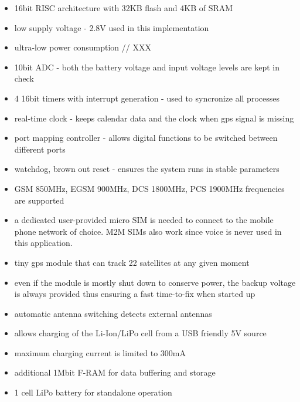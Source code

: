 \documentclass[a4paper,twoside]{refart}
\begin{document}
    \begin{itemize}
        \item 16bit RISC architecture with 32KB flash and 4KB of SRAM
        \item low supply voltage - 2.8V used in this implementation
        \item ultra-low power consumption // XXX
        \item 10bit ADC - both the battery voltage and input voltage levels are kept in check
        \item 4 16bit timers with interrupt generation - used to syncronize all processes
        \item real-time clock - keeps calendar data and the clock when gps signal is missing
        \item port mapping controller - allows digital functions to be switched between different ports
        \item watchdog, brown out reset - ensures the system runs in stable parameters
    \end{itemize}

    \begin{itemize}
        \item GSM 850MHz, EGSM 900MHz, DCS 1800MHz, PCS 1900MHz frequencies are supported
        \item a dedicated user-provided micro SIM is needed to connect to the mobile phone network of choice. M2M SIMs also work since voice is never used in this application.
    \end{itemize}

    \begin{itemize}
        \item tiny gps module that can track 22 satellites at any given moment
        \item even if the module is mostly shut down to conserve power, the backup voltage is always provided thus ensuring a fast time-to-fix when started up
        \item automatic antenna switching detects external antennas
    \end{itemize}
    \begin{itemize}
        \item allows charging of the Li-Ion/LiPo cell from a USB friendly 5V source
        \item maximum charging current is limited to 300mA
    \end{itemize}
    \begin{itemize}
        \item additional 1Mbit F-RAM for data buffering and storage
    \end{itemize}
    \begin{itemize}
        \item 1 cell LiPo battery for standalone operation
    \end{itemize}
\end{document}
